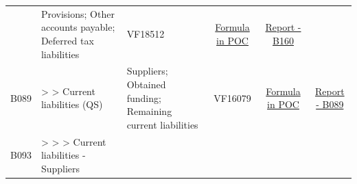 \documentclass[]{book}
\begin{document}
\begin{longtable}[]{@{}cllccc@{}}
\begin{minipage}[t]{0.20\columnwidth}
\end{minipage} & \begin{minipage}[t]{0.16\columnwidth}\raggedright
Provisions; Other accounts payable; Deferred tax liabilities\strut
\end{minipage} & \begin{minipage}[t]{0.09\columnwidth}\centering
VF18512\strut
\end{minipage} & \begin{minipage}[t]{0.15\columnwidth}\centering
\protect\hyperlink{b160---formula-in-poc}{Formula in POC}\strut
\end{minipage} & \begin{minipage}[t]{0.16\columnwidth}\centering
\href{./Auxiliary\%20Files/technical_reports/variable_report/B160(!).pdf}{Report - B160}\strut
\end{minipage}\tabularnewline
\begin{minipage}[t]{0.08\columnwidth}\centering
B089\strut
\end{minipage} & \begin{minipage}[t]{0.20\columnwidth}\raggedright
\textgreater{} \textgreater{} Current liabilities (QS)\strut
\end{minipage} & \begin{minipage}[t]{0.16\columnwidth}\raggedright
Suppliers; Obtained funding; Remaining current liabilities\strut
\end{minipage} & \begin{minipage}[t]{0.09\columnwidth}\centering
VF16079\strut
\end{minipage} & \begin{minipage}[t]{0.15\columnwidth}\centering
\protect\hyperlink{b089---formula-in-poc}{Formula in POC}\strut
\end{minipage} & \begin{minipage}[t]{0.16\columnwidth}\centering
\href{./Auxiliary\%20Files/technical_reports/variable_report/B089(!).pdf}{Report - B089}\strut
\end{minipage}\tabularnewline
\begin{minipage}[t]{0.08\columnwidth}\centering
B093\strut
\end{minipage} & \begin{minipage}[t]{0.20\columnwidth}\raggedright
\textgreater{} \textgreater{} \textgreater{} Current liabilities - Suppliers\strut
\end{minipage} & \begin{minipage}[t]{0.16\columnwidth}\raggedright
\strut
\end{minipage} & \begin{minipage}[t]{0.09\columnwidth}\centering

\end{minipage}
\end{longtable}
\end{document}
